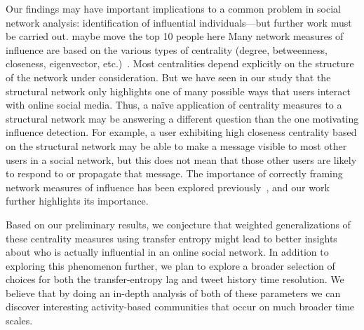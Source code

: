 Our findings may have important implications to a common problem in social network analysis: identification of influential individuals---but further work must be carried out.
\alert{maybe move the top 10 people here}
 Many network measures of influence are based on the various types of centrality (degree, betweenness, closeness, eigenvector, etc.)~\cite{newman2009networks}. Most centralities depend explicitly on the structure of the network under consideration. But we have seen in our study that the structural network only highlights one of many possible ways that users interact with online social media.
Thus, a na\"ive application of centrality measures to a structural network may be answering a different question than the one motivating influence detection. For example, a user exhibiting high closeness centrality based on the structural network may be able to make a message visible to most other users in a social network, but this does not mean that those other users are likely to respond to or propagate that message. The importance of correctly framing network measures of influence has been explored previously~\cite{kitsak2010identification}, and our work further highlights its importance. 

Based on our preliminary results, we conjecture that weighted generalizations of these centrality measures using transfer entropy might lead to better insights about who is actually influential in an online social network. In addition to exploring this phenomenon further, we plan to explore a broader selection of choices for both the transfer-entropy lag and tweet history time resolution. We believe that by doing an in-depth analysis of both of these parameters we can discover interesting activity-based communities that occur on much broader time scales.







